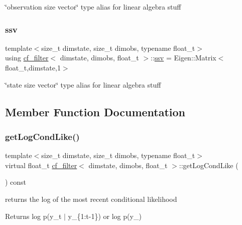 \char`\"{}observation size vector\char`\"{} type alias for linear algebra stuff \mbox{\label{classcf__filter_ad4bce534d6b7a494dae851846037c94b}} 
\subsubsection{\texorpdfstring{ssv}{ssv}}
{\footnotesize\ttfamily template$<$size\+\_\+t dimstate, size\+\_\+t dimobs, typename float\+\_\+t$>$ \\
using \hyperlink{classcf__filter}{cf\+\_\+filter}$<$ dimstate, dimobs, float\+\_\+t $>$\+::\hyperlink{classcf__filter_ad4bce534d6b7a494dae851846037c94b}{ssv} =  Eigen\+::\+Matrix$<$float\+\_\+t,dimstate,1$>$}

\char`\"{}state size vector\char`\"{} type alias for linear algebra stuff 

\subsection{Member Function Documentation}
\mbox{\label{classcf__filter_a11b26307172bf94b8075ed2cdb8fc09c}} 
\subsubsection{\texorpdfstring{get\+Log\+Cond\+Like()}{getLogCondLike()}}
{\footnotesize\ttfamily template$<$size\+\_\+t dimstate, size\+\_\+t dimobs, typename float\+\_\+t$>$ \\
virtual float\+\_\+t \hyperlink{classcf__filter}{cf\+\_\+filter}$<$ dimstate, dimobs, float\+\_\+t $>$\+::get\+Log\+Cond\+Like (\begin{DoxyParamCaption}{ }\end{DoxyParamCaption}) const\hspace{0.3cm}{\ttfamily [pure virtual]}}



returns the log of the most recent conditional likelihood 

\begin{DoxyReturn}{Returns}
log p(y\+\_\+t $\vert$ y\+\_\+\{1\+:t-\/1\}) or log p(y\+\_) 
\end{DoxyReturn}


